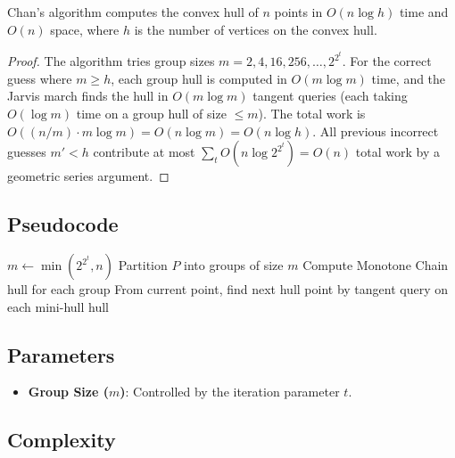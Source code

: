 \begin{theorem}\label{thm:chans_complexity}
Chan's algorithm computes the convex hull of $n$ points in $O(n \log h)$ time and $O(n)$ space, where $h$ is the number of vertices on the convex hull.
\end{theorem}
\begin{proof}
The algorithm tries group sizes $m = 2, 4, 16, 256, \ldots, 2^{2^t}$. For the correct guess where $m \ge h$, each group hull is computed in $O(m \log m)$ time, and the Jarvis march finds the hull in $O(m \log m)$ tangent queries (each taking $O(\log m)$ time on a group hull of size $\le m$). The total work is $O((n/m) \cdot m \log m) = O(n \log m) = O(n \log h)$. All previous incorrect guesses $m' < h$ contribute at most $\sum_{t} O(n \log 2^{2^t}) = O(n)$ total work by a geometric series argument.
\end{proof}

\subsection{Pseudocode}

\begin{algorithm}[htbp]
\caption{Chan's Convex Hull Algorithm}
\label{alg:chans_hull}
\begin{algorithmic}[1]
    \State $m \gets \min(2^{2^t}, n)$
    \State Partition $P$ into groups of size $m$
    \State Compute Monotone Chain hull for each group
    \State {}
    \State From current point, find next hull point by tangent query on each mini-hull
      \State \Return hull
    \EndIf
  \EndFor
\EndFunction
\end{algorithmic}
\end{algorithm}

\subsection{Parameters}

\begin{itemize}
\item \textbf{Group Size ($m$)}: Controlled by the iteration parameter $t$.
\end{itemize}

\subsection{Complexity}

